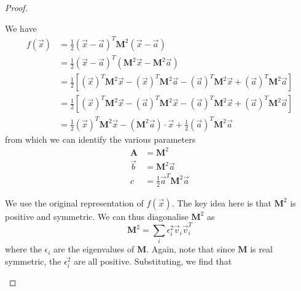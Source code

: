 \begin{proof}
\begin{parts}
\begin{center}
	\end{center}
	\item We have
	\begin{align*}
		f(\vec{x}) &= \frac 12 (\vec x - \vec a)^T \mathbf{M}^2(\vec x - \vec a)\\
		&= \frac 12 (\vec x - \vec a)^T(\mathbf{M}^2 \vec x - \mathbf{M}^2\vec a)\\
		&= \frac 12 \left[(\vec x)^T \mathbf{M}^2 \vec x - (\vec x)^T \mathbf{M}^2\vec a - (\vec a)^T \mathbf{M}^2 \vec x + (\vec a)^T \mathbf{M}^2\vec a\right] \\
		&= \frac 12 \left[(\vec x)^T \mathbf{M}^2 \vec x - (\vec a)^T \mathbf{M}^2\vec x - (\vec a)^T \mathbf{M}^2 \vec x + (\vec a)^T \mathbf{M}^2\vec a\right] \\
		&= \frac 12 (\vec x)^T \mathbf{M}^2 \vec x - (\mathbf{M}^2 \vec a)\cdot \vec x + \frac 12 (\vec a)^T \mathbf{M}^2\vec a
	\end{align*}
from which we can identify the various parameters
\begin{align*}
	\mathbf{A} &= \mathbf{M}^2\\
	\vec b &= \mathbf{M}^2\vec{a}\\
	c &= \frac 12 \vec a^T \mathbf{M}^2\vec a
\end{align*}
\item We use the original representation of $f(\vec{x})$. The key idea here is that $\mathbf{M}^2$ is positive and symmetric. We can thus diagonalise $\mathbf{M}^2$ as
\[\mathbf{M}^2 = \sum_i \epsilon_i^2 \vec v_i \vec v_i^T\]
where the $\epsilon_i$ are the eigenvalues of $\mathbf{M}$. Again, note that since $\mathbf{M}$ is real symmetric, the $\epsilon_i^2$ are all positive. Substituting, we find that

\end{parts}
\end{proof}
